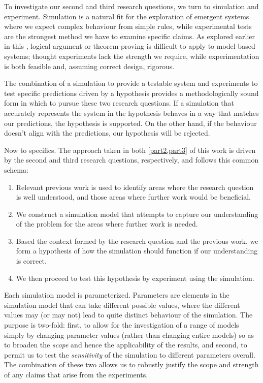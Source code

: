 To investigate our second and third research questions, we turn to simulation and experiment. Simulation is a natural fit for the exploration of emergent systems where we expect complex behaviour from simple rules, while experimental tests are the strongest method we have to examine specific claims. As explored earlier in this , logical argument or theorem-proving is difficult to apply to model-based systems; thought experiments lack the strength we require, while experimentation is both feasible and, assuming correct design, rigorous. 

The combination of a simulation to provide a testable system and experiments to test specific predictions driven by a hypothesis provides a methodologically sound form in which to pursue these two research questions. If a simulation that accurately represents the system in the hypothesis behaves in a way that matches our predictions, the hypothesis is supported. On the other hand, if the behaviour doesn't align with the predictions, our hypothesis will be rejected.

Now to specifics. The approach taken in both \cref{part2,part3} of this work is driven by the second and third research questions, respectively, and follows this common schema:
\begin{enumerate}
	\item Relevant previous work is used to identify areas where the research question is well understood, and those areas where further work would be beneficial.
	\item We construct a simulation model that attempts to capture our understanding of the problem for the areas where further work is needed.
	\item Based the context formed by the research question and the previous work, we form a hypothesis of how the simulation should function if our understanding is correct.
	\item We then proceed to test this hypothesis by experiment using the simulation.
\end{enumerate}

Each simulation model is parameterized. Parameters are elements in the simulation model that can take different possible values, where the different values may (or may not) lead to quite distinct behaviour of the simulation. The purpose is two-fold: first, to allow for the investigation of a range of models simply by changing parameter values (rather than changing entire models) so as to broaden the \emph{scope} and hence the applicability of the results, and second, to permit us to test the \emph{sensitivity} of the simulation to different parameters overall. The combination of these two allows us to robustly justify the scope and strength of any claims that arise from the experiments.

